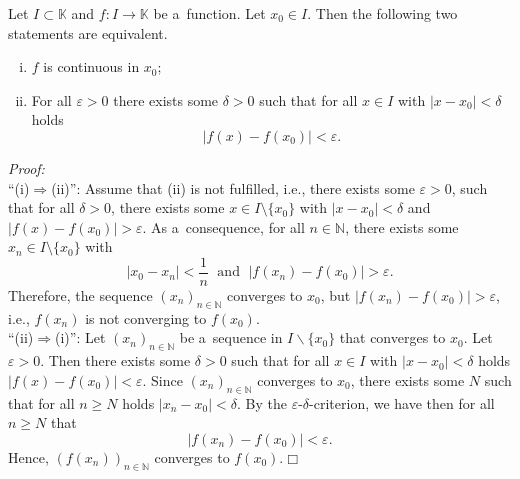 

\begin{Theorem}
Let $I\subset \mathbb{K}$ and $f:I\to\mathbb{K}$ be a~function. Let $x_0\in I$. Then the following two statements are equivalent.
\begin{enumerate}[(i)]
 \item $f$ is continuous in $x_0$;
 \item For all $\varepsilon>0$ there exists some $\delta>0$ such that for all $x\in I$ with $|x-x_0|<\delta$ holds
\[|f(x)-f(x_0)|<\varepsilon.\]
\end{enumerate}
\end{Theorem}


{\em Proof:}\\
``(i)$\Rightarrow$(ii)'': Assume that (ii) is not fulfilled, i.e., there exists some $\varepsilon>0$, such that for all $\delta>0$, there exists some $x\in I\setminus\{x_{0}\}$ with $|x-x_0|<\delta$ and $|f(x)-f(x_0)|>\varepsilon$. As a~consequence, for all $n\in\mathbb{N}$, there exists some $x_n\in I\setminus\{x_{0}\}$ with
\[|x_0-x_n|<\frac1n\;\text{ and }\;|f(x_n)-f(x_0)|>\varepsilon.\]
Therefore, the sequence $(x_n)_{n\in\mathbb{N}}$ converges to $x_0$, but $|f(x_n)-f(x_0)|>\varepsilon$,
i.e., $f(x_n)$ is not converging to $f(x_0)$.\\
``(ii)$\Rightarrow$(i)'': Let  $(x_n)_{n\in\mathbb{N}}$ be a~sequence in $I\backslash\{x_0\}$ that converges to $x_0$. Let $\varepsilon>0$. Then there exists some $\delta>0$ such that for all $x\in I$ with $|x-x_0|<\delta$ holds $|f(x)-f(x_0)|<\varepsilon$. Since $(x_n)_{n\in\mathbb{N}}$ converges to $x_0$, there exists some $N$ such that for all $n\geq N$ holds $|x_n-x_0|<\delta$. By the $\varepsilon$-$\delta$-criterion, we have then for all $n\geq N$ that
\[|f(x_n)-f(x_0)|<\varepsilon.\]
Hence, $(f(x_n))_{n\in\mathbb{N}}$ converges to $f(x_0)$.\hfill$\Box$

